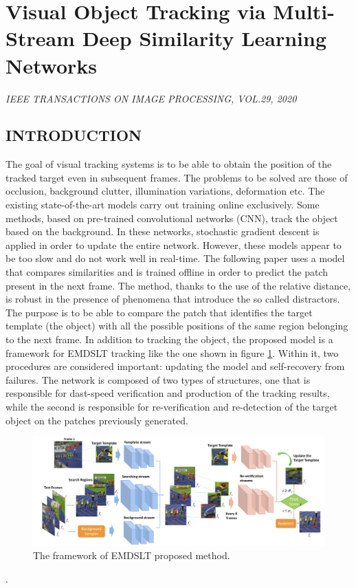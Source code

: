 \section{Visual Object Tracking via Multi-Stream Deep Similarity Learning Networks}

\begin{center}
    \author{
    Kunpeng Li,
    \emph{Student Member, IEEE},
    Yu Kong,
    \emph{Member, IEEE},
    Yunf Fu,
    \emph{Fellow, IEEE}
    }
\end{center}

\begin{center}
    \emph{IEEE TRANSACTIONS ON IMAGE PROCESSING, VOL.29, 2020}
\end{center}

\subsection{INTRODUCTION}
The goal of visual tracking systems is to be able to obtain the position of 
the tracked target even in subsequent frames. The problems to be solved are 
those of occlusion, background clutter, illumination variations, deformation 
etc. The existing state-of-the-art models carry out training online exclusively. 
Some methods, based on pre-trained convolutional networks (CNN), track 
the object based on the background. In these networks, stochastic gradient 
descent is applied in order to update the entire network. However, these 
models appear to be too slow and do not work well in real-time. The following 
paper uses a model that compares similarities and is trained offline in order to 
predict the patch present in the next frame. The method, thanks to the use of 
the relative distance, is robust in the presence of phenomena that introduce 
the so called distractors. The purpose is to be able to compare the patch that 
identifies the target template (the object) with all the possible positions 
of the same region belonging to the next frame. In addition to tracking the 
object, the proposed model is a framework for EMDSLT tracking like the 
one shown in figure \ref{fig:EMDSLT}. Within it, two procedures are considered important: 
updating the model and self-recovery from failures. The network is composed 
of two types of structures, one that is responsible for dast-speed verification 
and production of the tracking results, while the second is responsible for re-verification 
and re-detection of the target object on the patches previously 
generated.
\begin{figure}[h!]
    \centering
    \includegraphics[width = \linewidth]{images/paper8/EMDSLT.png}
    \centering
    \caption{The framework of EMDSLT proposed method.}
    \label{fig:EMDSLT}
\end{figure}.

